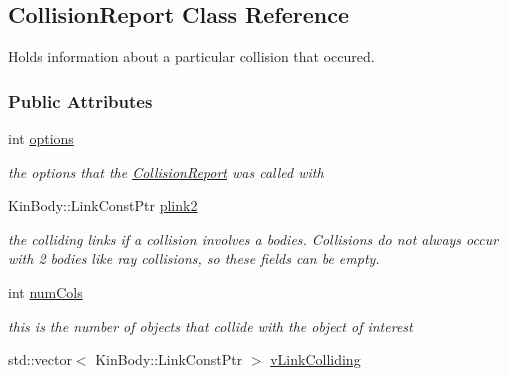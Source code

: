 \hypertarget{classOpenRAVE_1_1CollisionReport}{
\subsection{CollisionReport Class Reference}
\label{classOpenRAVE_1_1CollisionReport}
}


Holds information about a particular collision that occured.  


\subsubsection*{Public Attributes}
\begin{DoxyCompactItemize}
\item 
\hypertarget{classOpenRAVE_1_1CollisionReport_a849fa981f121eb25a67e4e14392840ba}{
int \hyperlink{classOpenRAVE_1_1CollisionReport_a849fa981f121eb25a67e4e14392840ba}{options}}
\label{classOpenRAVE_1_1CollisionReport_a849fa981f121eb25a67e4e14392840ba}

\begin{DoxyCompactList}\small\item\em the options that the \hyperlink{classOpenRAVE_1_1CollisionReport}{CollisionReport} was called with \item\end{DoxyCompactList}\item 
\hypertarget{classOpenRAVE_1_1CollisionReport_a66034fcc62ac4142477872950ef70663}{
KinBody::LinkConstPtr \hyperlink{classOpenRAVE_1_1CollisionReport_a66034fcc62ac4142477872950ef70663}{plink2}}
\label{classOpenRAVE_1_1CollisionReport_a66034fcc62ac4142477872950ef70663}

\begin{DoxyCompactList}\small\item\em the colliding links if a collision involves a bodies. Collisions do not always occur with 2 bodies like ray collisions, so these fields can be empty. \item\end{DoxyCompactList}\item 
\hypertarget{classOpenRAVE_1_1CollisionReport_a2d4acb52d99b57b5b524aaa557ab91eb}{
int \hyperlink{classOpenRAVE_1_1CollisionReport_a2d4acb52d99b57b5b524aaa557ab91eb}{numCols}}
\label{classOpenRAVE_1_1CollisionReport_a2d4acb52d99b57b5b524aaa557ab91eb}

\begin{DoxyCompactList}\small\item\em this is the number of objects that collide with the object of interest \item\end{DoxyCompactList}\item 
\hypertarget{classOpenRAVE_1_1CollisionReport_a4d32ef985c209aaaca9a4e61c9855e0b}{
std::vector$<$ KinBody::LinkConstPtr $>$ \hyperlink{classOpenRAVE_1_1CollisionReport_a4d32ef985c209aaaca9a4e61c9855e0b}{vLinkColliding}}
\label{classOpenRAVE_1_1CollisionReport_a4d32ef985c209aaaca9a4e61c9855e0b}


\end{DoxyCompactItemize}

